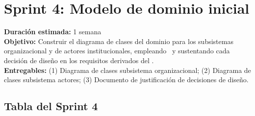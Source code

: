 \section*{Sprint 4: Modelo de dominio inicial}
\label{sprint:4}

\begin{tcolorbox}[sprintBox, title={Sprint 4 — Modelo de dominio inicial}]
  \textbf{Duración estimada:} 1 semana\\
  \textbf{Objetivo:} Construir el diagrama de clases del dominio para los
  subsistemas organizacional y de actores institucionales, empleando
  \plantuml\ y sustentando cada decisión de diseño en los requisitos
  derivados del \acuerdo.\\
  \textbf{Entregables:} (1) Diagrama de clases subsistema organizacional;
  (2) Diagrama de clases subsistema actores; (3) Documento de justificación
  de decisiones de diseño.
\end{tcolorbox}

\bigskip

\subsection*{Tabla del Sprint 4}

